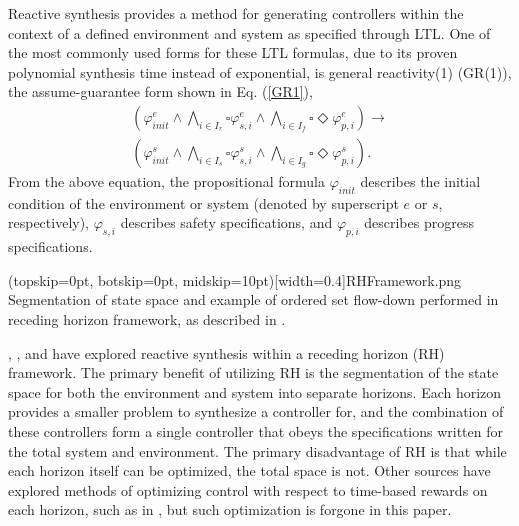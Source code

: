 \documentclass{ieeeaccess}
\newcommand{\always}{\square}
\newcommand{\eventually}{\Diamond}
\begin{document}
Reactive synthesis provides a method for generating controllers within the context of a defined environment and system as specified through LTL. One of the most commonly used forms for these LTL formulas, due to its proven polynomial synthesis time instead of exponential, is general reactivity(1) (GR(1)), the assume-guarantee form shown in Eq. (\ref{GR1}),
\begin{equation}
\label{GR1}
\begin{aligned}
(\varphi_{init}^{e} \land \bigwedge_{i \in I_r} \always \varphi_{s,i}^{e} \land \bigwedge_{i \in I_f} \always \eventually \varphi_{p,i}^{e}) \longrightarrow \\ (\varphi_{init}^{s} \land \bigwedge_{i \in I_s} \always \varphi_{s,i}^{s} \land \bigwedge_{i \in I_g} \always \eventually \varphi_{p,i}^{s}).
\end{aligned}
\end{equation}
From the above equation, the propositional formula $\varphi_{init}$  describes the initial condition of the environment or system (denoted by superscript $e$ or $s$, respectively), $\varphi_{s,i}$  describes safety specifications, and $\varphi_{p,i}$ describes progress specifications.

\Figure[t!](topskip=0pt, botskip=0pt, midskip=10pt)[width=0.4\textwidth]{RHFramework.png}
{Segmentation of state space and example of ordered set flow-down performed in receding horizon framework, as described in \cite{c10}.\label{RhFrame}}

\cite{c8}, \cite{c9}, and \cite{c10} have explored reactive synthesis within a receding horizon (RH) framework. The primary benefit of utilizing RH is the segmentation of the state space for both the environment and system into separate horizons. Each horizon provides a smaller problem to synthesize a controller for, and the combination of these controllers form a single controller that obeys the specifications written for the total system and environment. The primary disadvantage of RH is that while each horizon itself can be optimized, the total space is not. Other sources have explored methods of optimizing control with respect to time-based rewards on each horizon, such as in \cite{c9}, but such optimization is forgone in this paper. 
\end{document}
